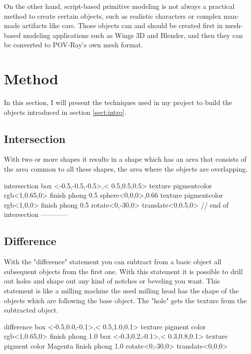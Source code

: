\documentclass[runningheads]{llncs}
\begin{document}
    On the other hand, script-based primitive modeling is not always a practical method to create certain objects, such as realistic characters or complex man-made artifacts like cars. Those objects can and should be created first in mesh-based modeling applications such as Wings 3D and Blender, and then they can be converted to POV-Ray's own mesh format.
    
    \section{Method}
    In this section, I will present the techniques used in my project to build the objects introduced in section \ref{sect:intro}.
    \subsection{Intersection}
    With two or more shapes it results in a shape which has an area that consists of the area common to all these shapes, the area where the objects are overlapping. \cite{intersection}
    
    \begin{spverbatim}
    intersection{
        box {<-0.5,-0.5,-0.5>,< 0.5,0.5,0.5>
             texture{
               pigment{color rgb<1,0.65,0>}
               finish {phong 0.5}}
            }
        sphere{<0,0,0>,0.66
             texture{
               pigment{color rgb<1,0,0>}
               finish {phong 0.5}}
            }
        rotate<0,-30,0>
        translate<0,0.5,0>
        } // end of intersection ------------
    \end{spverbatim}
    
    \subsection{Difference}
    With the "difference" statement you can subtract from a basic object all subsequent objects from the first one. With this statement it is possible to drill out holes and shape out any kind of notches or beveling you want. This statement is like a milling machine the used milling head has the shape of the objects which are following the base object. The "hole" gets the texture from the subtracted object. \cite{difference}
    
    \begin{spverbatim}
        difference{
            box {<-0.5,0.0,-0.1>,< 0.5,1.0,0.1>
                 texture{ pigment{ color rgb<1,0.65,0>}
                          finish { phong 1.0 }}
                }
            box {<-0.3,0.2,-0.1>,< 0.3,0.8,0.1>
                 texture{ pigment{ color Magenta}
                          finish { phong 1.0 }}
                }
            rotate<0,-30,0> translate<0,0,0>}
    \end{spverbatim}
    
\end{document}
